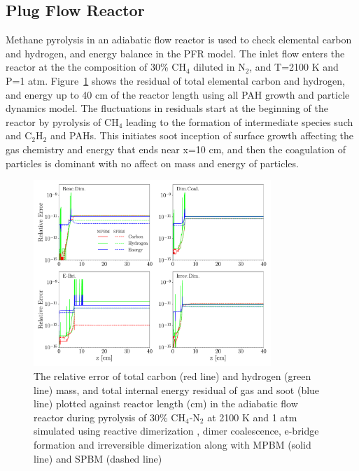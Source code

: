 \subsection{Plug Flow Reactor}
Methane pyrolysis in an adiabatic flow reactor is used to check elemental carbon and hydrogen, and energy balance in the PFR model. The inlet flow enters the reactor at the the composition of 30\% $\mathrm{CH_4}$ diluted in $\mathrm{N_2}$, and T=2100 K and P=1 atm. Figure~\ref{fig:pfrvalid} shows the residual of total elemental carbon and hydrogen, and energy up to 40 cm of the reactor length using all PAH growth and particle dynamics model. The fluctuations in residuals start at the beginning of the reactor by pyrolysis of $\mathrm{CH_4}$ leading to the formation of intermediate species such and $\mathrm{C_2H_2}$ and PAHs. This initiates soot inception of surface growth affecting the gas chemistry and energy that ends near x=10 cm, and then the coagulation of particles is dominant with no affect on mass and energy of particles.




\begin{figure}[!htbp]
	\centering
	\includegraphics[width=0.8\textwidth]{Figures/Results/Validation/PFR/relerr_pfr.pdf}
	\caption{The relative error of total carbon (red line) and hydrogen (green line) mass, and total internal energy residual of gas and soot (blue line) plotted against reactor length (cm) in the adiabatic flow reactor during pyrolysis of 30\% $\mathrm{CH_4}$-$\mathrm{N_2}$ at 2100 K and 1 atm simulated using reactive dimerization , dimer coalescence, e-bridge formation and irreversible dimerization along with MPBM (solid line) and SPBM (dashed line)}
	\label{fig:pfrvalid}
\end{figure}